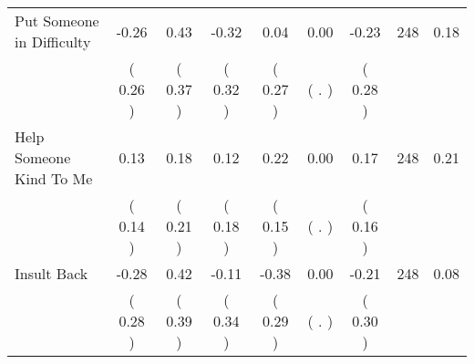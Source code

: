 \begin{tabular}{lcccccccc}
Put Someone in Difficulty &     -0.26 &      0.43 &     -0.32 &      0.04 &      0.00 &     -0.23 & 248 &       0.18 \\ 
 & (     0.26 ) & (     0.37 ) & (     0.32 ) & (     0.27 ) & (        . ) & (     0.28 ) & \\
Help Someone Kind To Me &      0.13 &      0.18 &      0.12 &      0.22 &      0.00 &      0.17 & 248 &       0.21 \\ 
 & (     0.14 ) & (     0.21 ) & (     0.18 ) & (     0.15 ) & (        . ) & (     0.16 ) & \\
Insult Back &     -0.28 &      0.42 &     -0.11 &     -0.38 &      0.00 &     -0.21 & 248 &       0.08 \\ 
 & (     0.28 ) & (     0.39 ) & (     0.34 ) & (     0.29 ) & (        . ) & (     0.30 ) & \\
\bottomrule
\end{tabular}
